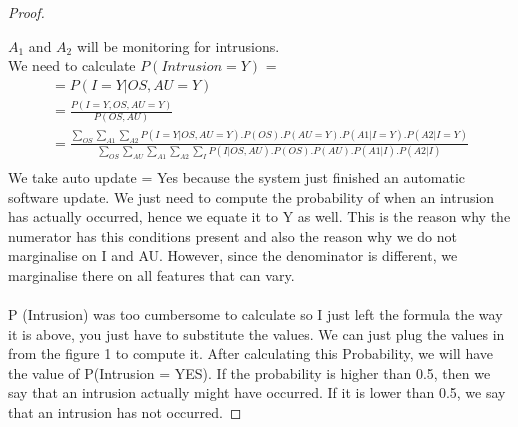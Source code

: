 \documentclass{article}
\theoremstyle{case}
\begin{document}
\begin{proof}
\begin{figure}[h]
            \end{figure}
$A_1$ and $A_2$ will be monitoring for intrusions. \\
We need to calculate  $P(Intrusion = Y)$ = \\
\begin{gather*}
    = P(I = Y|OS, AU = Y) \\
    = \frac{P(I = Y,OS,AU = Y)}{P(OS,AU)}\\
    = \frac{\sum_{OS}\sum_{A1}\sum_{A2}P(I=Y|OS,AU= Y).P(OS).P(AU=Y).P(A1|I=Y).P(A2|I=Y)}{\sum_{OS}\sum_{AU}\sum_{A1}\sum_{A2}\sum_{I}P(I|OS,AU).P(OS).P(AU).P(A1|I).P(A2|I)} \\
\end{gather*}
We take auto update = Yes because the system just finished an automatic software update. We just need to compute the probability of when an intrusion has actually occurred, hence we equate it to Y as well. This is the reason why the numerator has this conditions present and also the reason why we do not marginalise on I and AU. However, since the denominator is different, we marginalise there on all features that can vary.  \\ \\
P (Intrusion) was too cumbersome to calculate so I just left the formula the way it is above, you just have to substitute the values. We can just plug the values in from the figure 1 to compute it. After calculating this Probability, we will have the value of P(Intrusion = YES). If the probability is higher than 0.5, then we say that an intrusion actually might have occurred. If it is lower than 0.5, we say that an intrusion has not occurred. 
\end{proof}
\end{document}
